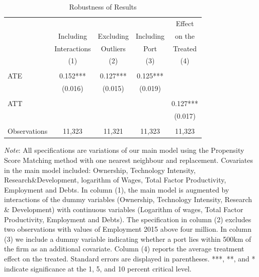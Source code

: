 \documentclass[a4paper,11pt]{scrartcl}
\begin{document}
 
\begin{table}[h]
  \centering
   \caption{Robustness of Results}
   \label{tab:robust}
\begin{threeparttable}
 
\begin{tabular}{lcccc} 
	\hline 
	\hline
 		& & & & Effect \\
 		& Including & Excluding & Including & on the\\
 		& Interactions & Outliers 
 		& Port & Treated \\
 		& (1) & (2) & (3) & (4) \\ 
 	\hline
 		&  &  &  &  \\
ATE 	& 0.152*** & 0.127*** & 0.125*** &  \\
 		& (0.016) & (0.015) & (0.019) &  \\
 		&  &  &  &  \\
ATT 	&  &  &  & 0.127*** \\
 		&  &  &  & (0.017) \\
 		&  &  &  &  \\
Observations & 11,323 & 11,321 & 11,323 & 11,323 \\ 
	\hline
	\hline
\end{tabular}

\begin{tablenotes}[flushleft]
     \footnotesize  
    
\item \textit{Note}: All specifications are variations of our main model using the Propensity Score Matching method with one nearest neighbour and replacement. Covariates in the main model included: Ownership, Technology Intensity, Research\&Development, logarithm of Wages, Total Factor Productivity, Employment and Debts. In column (1), the main model is augmented by interactions of the dummy variables (Ownership, Technology Intensity, Research \& Development) with continuous variables (Logarithm of wages, Total Factor Productivity, Employment and Debts).  The specification in column (2) excludes two observations with values of Employment 2015 above four million. In column (3) we include a dummy variable indicating whether a port lies within 500km of the firm as an additional covariate. Column (4) reports the average treatment effect on the treated. Standard errors are displayed in parentheses. ***, **, and * indicate significance at the 1, 5, and 10 percent critical level. 

\end{tablenotes}

\end{threeparttable}
\end{table}
\end{document}
